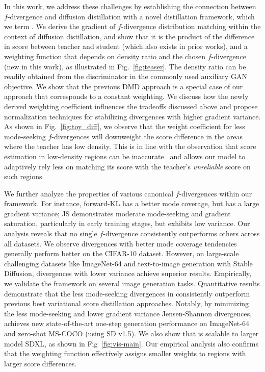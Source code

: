 In this work, we address these challenges by establishing the connection between $f$-divergence and diffusion distillation with a novel distillation framework, which we term \method. We derive the gradient of $f$-divergence distribution matching within the context of diffusion distillation, and show that it is the product of the difference in score between teacher and student (which also exists in prior works), and a weighting function that depends on density ratio and the chosen $f$-divergence (new in this work), as illustrated in Fig.~\ref{fig:teaser}. The density ratio can be readily obtained from the discriminator in the commonly used auxiliary GAN objective. We show that the previous DMD approach is a special case of our approach that corresponds to a constant weighting. We discuss how the newly derived weighting coefficient influences the tradeoffs discussed above and propose normalization techniques for stabilizing divergences with higher gradient variance. As shown in Fig.~\ref{fig:toy_diff}, we observe that the weight coefficient for less mode-seeking $f$-divergences will downweight the score difference in the areas where the teacher has low density. This is in line with the observation that score estimation in low-density regions can be inaccurate~\cite{karras2024guiding} and allows our model to adaptively rely less on matching its score with the teacher's \textit{unreliable} score on such regions. 

We further analyze the properties of various canonical $f$-divergences within our framework. For instance, forward-KL has a better mode coverage, but has a large gradient variance; JS demonstrates moderate mode-seeking and gradient saturation, particularly in early training stages, but exhibits low variance. Our analysis reveals that no single $f$-divergence consistently outperforms others across all datasets. We observe divergences with better mode coverage tendencies generally perform better on the CIFAR-10 dataset. However, on large-scale challenging datasets like ImageNet-64 and text-to-image generation with Stable Diffusion, divergences with lower variance achieve superior results. Empirically, we validate the \methodtext framework on several image generation tasks. Quantitative results demonstrate that the less mode-seeking divergences in \methodtext consistently outperform previous best variational score distillation approaches. Notably, by minimizing the less mode-seeking and lower gradient variance Jensen-Shannon divergences, \methodtext achieves new state-of-the-art one-step generation performance on ImageNet-64 and zero-shot MS-COCO (using SD v1.5). We also show that \methodtext is scalable to larger model SDXL, as shown in Fig~\ref{fig:vis-main}. Our empirical analysis also confirms that the weighting function effectively assigns smaller weights to regions with larger score differences.


